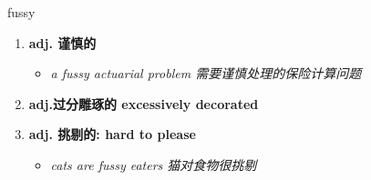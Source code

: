 
\begin{frame}
{\huge fussy}
\begin{center}
\begin{enumerate}\Large
  \item \textbf{adj. 谨慎的}
  \begin{itemize}
    \item \em{\Large{a fussy actuarial problem 需要谨慎处理的保险计算问题}}
  \end{itemize}
  \item \textbf{adj.过分雕琢的 excessively decorated}
  \item \textbf{adj. 挑剔的: hard to please}
  \begin{itemize}
    \item \em{\Large{cats are fussy eaters 猫对食物很挑剔}}
  \end{itemize}
\end{enumerate}
\end{center}
\end{frame}
